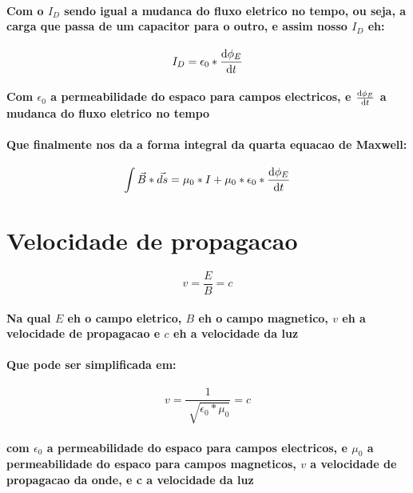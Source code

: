 \documentclass[12pt,twoside, a4paper, twocolumn]{article}
\begin{document}
\paragraph*{Com o $I_D$ sendo igual a mudanca do fluxo eletrico no tempo, ou seja, a carga que passa de um capacitor para o outro, e assim nosso $I_D$ eh:}
\begin{equation}
    I_D = \epsilon_0 * \frac{\mathrm d \phi_E}{\mathrm d t}
\end{equation}
\paragraph*{Com $\epsilon_0$ a permeabilidade do espaco para campos electricos, e $\frac{\mathrm d \phi_E}{\mathrm d t}$ a mudanca do fluxo eletrico no tempo}
\paragraph*{Que finalmente nos da a forma integral da quarta equacao de Maxwell:}
\begin{equation}
    \int \vec{B} * \vec{ds} = \mu_0 * I + \mu_0 * \epsilon_0 * \frac{\mathrm d \phi_E}{\mathrm d t}
\end{equation}

\section{Velocidade de propagacao}
\begin{equation}
    v = \frac{E}{B} = c
\end{equation}
\paragraph*{Na qual $E$ eh o campo eletrico, $B$ eh o campo magnetico, $v$ eh a velocidade de propagacao e $c$ eh a velocidade da luz}
\paragraph*{Que pode ser simplificada em:}
\begin{equation}
    v = \frac{1}{\sqrt[]{\epsilon_0 * \mu_0}} = c
\end{equation}
\paragraph*{com $\epsilon_0$ a permeabilidade do espaco para campos electricos, e $\mu_0$ a permeabilidade do espaco para campos magneticos, $v$ a velocidade de propagacao da onde, e c a velocidade da luz}
\end{document}
